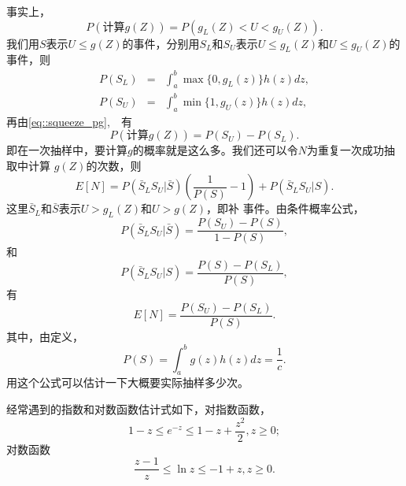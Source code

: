 事实上，
\begin{equation}
  P(\mbox{计算}g(Z)) = P(g_L(Z) < U < g_U(Z)).
  \label{eq::squeeze_pg}
\end{equation}
我们用$S$表示$U \leq g(Z)$的事件，分别用$S_L$和$S_U$表示$U \leq
g_L(Z)$和$U \leq g_U(Z)$的事件，则
\begin{eqnarray}
  P(S_L) &=& \int_a^b \max\{0, g_L(z)\}h(z)dz,\\
  \label{eq::squeeze_psl}
  P(S_U) &=& \int_a^b \min\{1, g_U(z)\}h(z)dz,
  \label{eq::squeeze_psu}
\end{eqnarray}
再由\ref{eq::squeeze_pg},　有
\begin{equation}
  P(\mbox{计算}g(Z)) = P(S_U) - P(S_L).
  \label{eq::squeeze_pg2}
\end{equation}
即在一次抽样中，要计算$g$的概率就是这么多。我们还可以令$N$为重复一次成功抽取中计算
$g(Z)$的次数，则
\begin{equation}
  E[N] = P(\bar{S}_LS_U | \bar{S})\left(\frac{1}{P(S)} - 1\right)
  + P(\bar{S}_LS_U | S).
  \label{eq::squeeze_en}
\end{equation}
这里$\bar{S}_L$和$\bar{S}$表示$U > g_L(Z)$和$U > g(Z)$，即补
事件。由条件概率公式，
\begin{equation}
  P(\bar{S}_LS_U | \bar{S}) = \frac{P(S_U) - P(S)}{1 - P(S)},
  \label{eq::squeeze_r:}
\end{equation}
和
\begin{equation}
  P(\bar{S}_LS_U | S) = \frac{P(S) - P(S_L)}{P(S)},
  \label{eq::squeeze_a}
\end{equation}
有
\begin{equation}
  E[N] = \frac{P(S_U) - P(S_L)}{P(S)}.
  \label{eq::squeeze_en_result}
\end{equation}
其中，由定义，
\begin{equation}
  P(S) = \int_a^b g(z)h(z)dz = \frac{1}{c}.
  \label{eq::squeeze_ps}
\end{equation}
用这个公式可以估计一下大概要实际抽样多少次。

经常遇到的指数和对数函数估计式如下，对指数函数，
\begin{equation}
  1 - z \leq e^{-z} \leq 1 - z + \frac{z^2}{2}, z \geq 0;
  \label{eq::squeeze_exp}
\end{equation}
对数函数
\begin{equation}
  \frac{z - 1}{z} \leq \ln z \leq -1 + z, z \geq 0.
\end{equation}

